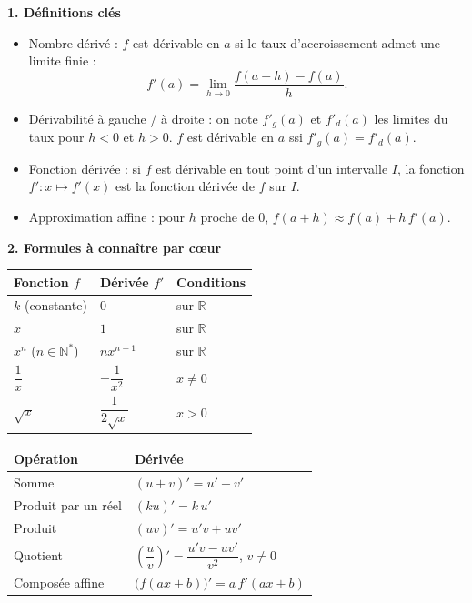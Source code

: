 \documentclass[11pt]{article}
\newcommand{\cle}[1]{{\popxbold\color{popdark}#1}}
\begin{document}
\begin{bilan}
\textbf{1. Définitions clés}
\begin{itemize}
  \item \cle{Nombre dérivé} : $f$ est dérivable en $a$ si le taux d'accroissement admet une limite finie :
  \[ f'(a)=\lim_{h\to 0}\frac{f(a+h)-f(a)}{h}. \]
  \item \cle{Dérivabilité à gauche / à droite} : on note $f'_g(a)$ et $f'_d(a)$ les limites du taux pour $h<0$ et $h>0$. $f$ est dérivable en $a$ ssi $f'_g(a)=f'_d(a)$.
  \item \cle{Fonction dérivée} : si $f$ est dérivable en tout point d'un intervalle $I$, la fonction $f' : x\mapsto f'(x)$ est la fonction dérivée de $f$ sur $I$.
  \item \cle{Approximation affine} : pour $h$ proche de $0$, $f(a+h)\approx f(a)+h\,f'(a)$.
\end{itemize}

\textbf{2. Formules à connaître par cœur}
\begin{center}
\begin{tabularx}{\linewidth}{|l|X|X|}\hline
\rowcolor{popblueL} \textbf{Fonction $f$} & \textbf{Dérivée $f'$} & \textbf{Conditions} \\ \hline
$k$ (constante) & $0$ & sur $\mathbb{R}$ \\ \hline
$x$ & $1$ & sur $\mathbb{R}$ \\ \hline
$x^n$ ($n\in\mathbb{N}^*$) & $n x^{n-1}$ & sur $\mathbb{R}$ \\ \hline
$\dfrac{1}{x}$ & $-\dfrac{1}{x^2}$ & $x\neq 0$ \\ \hline
$\sqrt{x}$ & $\dfrac{1}{2\sqrt{x}}$ & $x>0$ \\ \hline
\end{tabularx}
\end{center}

\begin{center}
\begin{tabularx}{\linewidth}{|l|X|}\hline
\rowcolor{popgreenL} \textbf{Opération} & \textbf{Dérivée} \\ \hline
Somme & $(u+v)'=u'+v'$ \\ \hline
Produit par un réel & $(ku)'=k\,u'$ \\ \hline
Produit & $(uv)'=u'v+uv'$ \\ \hline
Quotient & $\left(\dfrac{u}{v}\right)'=\dfrac{u'v-uv'}{v^2}$, \quad $v\neq 0$ \\ \hline
Composée affine & $\bigl(f(ax+b)\bigr)'=a\,f'(ax+b)$ \\ \hline
\end{tabularx}
\end{center}


\end{bilan}
\end{document}

